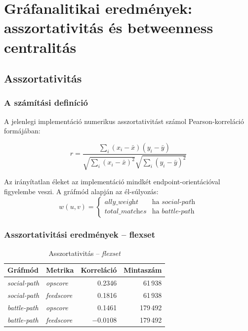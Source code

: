 \chapter{Gráfanalitikai eredmények: asszortativitás és betweenness centralitás}

\section{Asszortativitás}

\subsection{A számítási definíció}

A jelenlegi implementáció numerikus asszortativitást számol Pearson-korreláció formájában:

\begin{equation}
r = \frac{\sum_i (x_i-\bar{x})(y_i-\bar{y})}{\sqrt{\sum_i (x_i-\bar{x})^2}\sqrt{\sum_i (y_i-\bar{y})^2}}
\end{equation}

Az irányítatlan éleket az implementáció mindkét endpoint-orientációval figyelembe veszi. A gráfmód alapján az él-súlyozás:
\begin{equation}
w(u,v) = \begin{cases}
\textit{ally\_weight} & \text{ha } \textit{social-path} \\
\textit{total\_matches} & \text{ha } \textit{battle-path}
\end{cases}
\end{equation}

\subsection{Asszortativitási eredmények -- flexset}

\begin{table}[H]
\centering
\caption{Asszortativitás -- \textit{flexset}}
\begin{tabular}{llrr}
\toprule
\textbf{Gráfmód} & \textbf{Metrika} & \textbf{Korreláció} & \textbf{Mintaszám} \\
\midrule
\textit{social-path} & \textit{opscore} & 0.2346 & 61\,938 \\
\textit{social-path} & \textit{feedscore} & 0.1816 & 61\,938 \\
\textit{battle-path} & \textit{opscore} & 0.1461 & 179\,492 \\
\textit{battle-path} & \textit{feedscore} & $-0.0108$ & 179\,492 \\
\bottomrule
\end{tabular}
\end{table}

